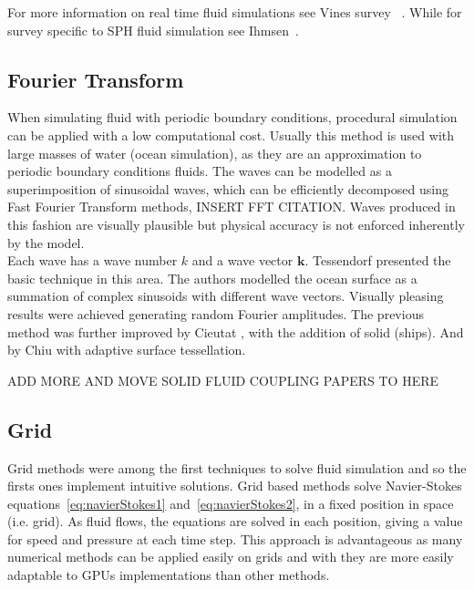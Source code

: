 For more information on real time fluid simulations see Vines survey ~\cite{Vines2012}.
While for survey specific to SPH fluid simulation see Ihmsen~\cite{Ihmsen2014}.

\subsection{Fourier Transform}

When simulating fluid with periodic boundary conditions, procedural simulation can be applied with a low computational cost.
Usually this method is used with large masses of water (ocean simulation), as they are an approximation to periodic boundary conditions fluids.
The waves can be modelled as a superimposition of sinusoidal waves, which can be efficiently decomposed using Fast Fourier Transform methods, INSERT FFT CITATION.
Waves produced in this fashion are visually plausible but physical accuracy is not enforced inherently by the model.\\

Each wave has a wave number $k$ and a wave vector $\mathbf{k}$.
Tessendorf \cite{Tessendorf2001} presented the basic technique in this area.
The authors modelled the ocean surface as a summation of complex sinusoids with different wave vectors.
Visually pleasing results were achieved generating random Fourier amplitudes.
The previous method was further improved by Cieutat \cite{Cieutat2003}, with the addition of solid (ships).
And by Chiu \cite{Chiu2006} with adaptive surface tessellation.


ADD MORE AND MOVE SOLID FLUID COUPLING PAPERS TO HERE

\subsection{Grid}

Grid methods were among the first techniques to solve fluid simulation and so the firsts ones implement intuitive solutions.
Grid based methods solve Navier-Stokes equations~\ref{eq:navierStokes1} and~\ref{eq:navierStokes2}, in a fixed position in space (i.e. grid).
As fluid flows, the equations are solved in each position, giving a value for speed and pressure at each time step.
This approach is advantageous as many numerical methods can be applied easily on grids and with they are more easily adaptable to GPUs implementations than other methods.\\

